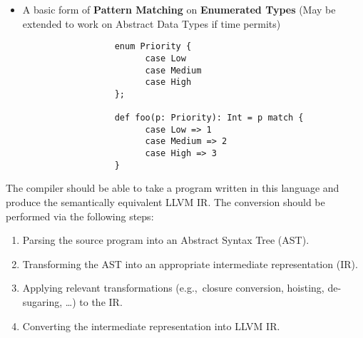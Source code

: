\begin{itemize}
      \item A basic form of \textbf{Pattern Matching} on \textbf{Enumerated Types}
            (May be extended to work on Abstract Data Types if time permits)
            \begin{verbatim}
                  enum Priority {
                        case Low
                        case Medium
                        case High
                  };

                  def foo(p: Priority): Int = p match {
                        case Low => 1
                        case Medium => 2
                        case High => 3
                  }
            \end{verbatim}

\end{itemize}

The compiler should be able to take a program written in this language and produce the semantically
equivalent LLVM IR. The conversion should be performed via the following steps:

\begin{enumerate}
      \item Parsing the source program into an Abstract Syntax Tree (AST).
      \item Transforming the AST into an appropriate intermediate representation (IR).
      \item Applying relevant transformations (e.g.,\ closure conversion, hoisting, de-sugaring,
            \dots) to the IR.
      \item Converting the intermediate representation into LLVM IR.
\end{enumerate}

